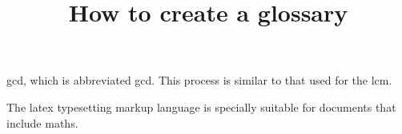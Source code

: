 \documentclass{article}
\title{How to create a glossary}
\author{ }
\date{ }
\begin{document}
\maketitle
\acrlong{gcd}, which is abbreviated \acrshort{gcd}. This process 
is similar to that used for the \acrfull{lcm}.

The \Gls{latex} typesetting markup language is specially suitable 
for documents that include \gls{maths}. 

\printglossary[type=\acronymtype]
\printglossary
\end{document}
